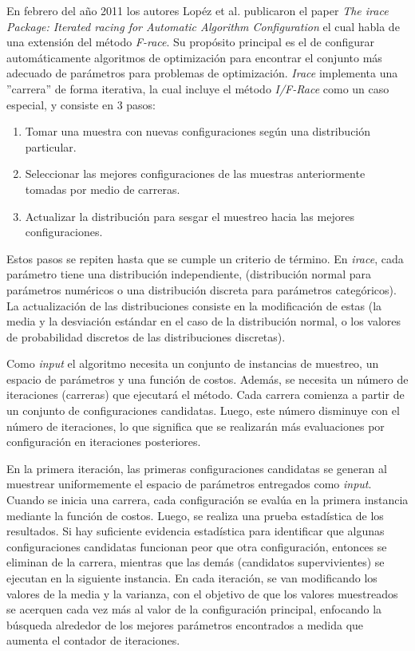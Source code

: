 \documentclass[letter, 10pt]{article}
\begin{document}
\begin{multicols}{2}
En febrero del año 2011 los autores  Lopéz et al. publicaron el paper \textit{The irace Package: Iterated racing for Automatic Algorithm Configuration}\cite{LpezIbez2011TheIP} el cual habla de una extensión del método \textit{F-race}. Su propósito principal es el de configurar automáticamente algoritmos de optimización para encontrar el conjunto más adecuado de parámetros para problemas de optimización. \textit{Irace} implementa una ''carrera'' de forma iterativa, la cual incluye el método \textit{I/F-Race} como un caso especial, y consiste en 3 pasos: 
\begin{enumerate}
    \item Tomar una muestra con nuevas configuraciones según una distribución particular.
    \item Seleccionar las mejores configuraciones de las muestras anteriormente tomadas por medio de carreras.
    \item Actualizar la distribución para sesgar el muestreo hacia las mejores configuraciones.
\end{enumerate}

Estos pasos se repiten hasta que se cumple un criterio de término. En \textit{irace}, cada parámetro tiene una distribución independiente, (distribución normal para parámetros numéricos o una distribución discreta para parámetros categóricos). La actualización de las distribuciones consiste en la modificación de estas (la media y la desviación estándar en el caso de la distribución normal, o los valores de probabilidad discretos de las distribuciones discretas).

Como \textit{input} el algoritmo necesita un conjunto de instancias de muestreo, un espacio de parámetros y una función de costos. Además, se necesita un número de iteraciones (carreras) que ejecutará el método. Cada carrera comienza a partir de un conjunto de configuraciones candidatas. Luego, este número disminuye con el número de iteraciones, lo que significa que se realizarán más evaluaciones por configuración en iteraciones posteriores.

En la primera iteración, las primeras configuraciones candidatas se generan al muestrear uniformemente el espacio de parámetros entregados como \textit{input}. Cuando se inicia una carrera, cada configuración se evalúa en la primera instancia mediante la función de costos. Luego, se realiza una prueba estadística de los resultados. Si hay suficiente evidencia estadística para identificar que algunas configuraciones candidatas funcionan peor que otra configuración, entonces se eliminan de la carrera, mientras que las demás (candidatos supervivientes) se ejecutan en la siguiente instancia. En cada iteración, se van modificando los valores de la media y la varianza, con el objetivo de que los valores muestreados se acerquen cada vez más al valor de la configuración principal, enfocando la búsqueda alrededor de los mejores parámetros encontrados a medida que aumenta el contador de iteraciones.


\end{multicols}
\end{document}
